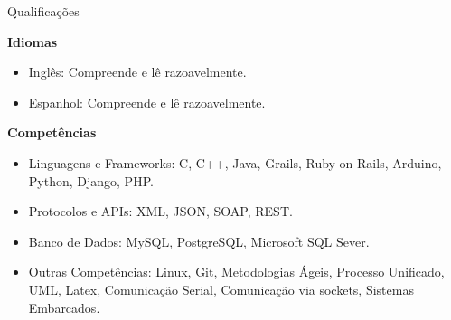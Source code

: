 \documentclass{resume} %
\begin{document}
\begin{rSection}{Qualificações}

\textbf{Idiomas}
\begin{itemize}
	\item Inglês: Compreende e lê razoavelmente.
	\item Espanhol: Compreende e lê razoavelmente.
\end{itemize}

\textbf{Competências}
\begin{itemize}
	\item Linguagens e Frameworks: C, C++, Java, Grails, Ruby on Rails, Arduino, Python, Django, PHP.
	\item Protocolos e APIs: XML, JSON, SOAP, REST.
	\item Banco de Dados: MySQL, PostgreSQL, Microsoft SQL Sever.
	\item Outras Competências: Linux, Git, Metodologias Ágeis, Processo Unificado, UML, Latex, Comunicação Serial, Comunicação via sockets, Sistemas Embarcados.
\end{itemize}

\end{rSection}
\end{document}

